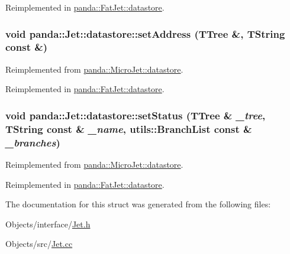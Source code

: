 Reimplemented in \hyperlink{structpanda_1_1FatJet_1_1datastore_ac707315048c1fe184534202259fbdda9}{panda::FatJet::datastore}.\hypertarget{structpanda_1_1Jet_1_1datastore_aba38557e272994b9913ffbe323892d7d}{
\subsubsection[{setAddress}]{\setlength{\rightskip}{0pt plus 5cm}void panda::Jet::datastore::setAddress (TTree \&, \/  TString const \&)}}
\label{structpanda_1_1Jet_1_1datastore_aba38557e272994b9913ffbe323892d7d}


Reimplemented from \hyperlink{structpanda_1_1MicroJet_1_1datastore_a475b19becb4a39eb0248e8b9c785feb3}{panda::MicroJet::datastore}.

Reimplemented in \hyperlink{structpanda_1_1FatJet_1_1datastore_a0064ba6151edcef6eb9d4c5b6a9fdcf7}{panda::FatJet::datastore}.\hypertarget{structpanda_1_1Jet_1_1datastore_ae5a3ebcab7eefec1efc08e4f714ce2ad}{
\subsubsection[{setStatus}]{\setlength{\rightskip}{0pt plus 5cm}void panda::Jet::datastore::setStatus (TTree \& {\em \_\-tree}, \/  TString const \& {\em \_\-name}, \/  {\bf utils::BranchList} const \& {\em \_\-branches})}}
\label{structpanda_1_1Jet_1_1datastore_ae5a3ebcab7eefec1efc08e4f714ce2ad}


Reimplemented from \hyperlink{structpanda_1_1MicroJet_1_1datastore_a5dad86e6e7ed7f7ee5ffb793bb81cbbe}{panda::MicroJet::datastore}.

Reimplemented in \hyperlink{structpanda_1_1FatJet_1_1datastore_a7c0b79a4a6e7875278841d4bc8a7deba}{panda::FatJet::datastore}.

The documentation for this struct was generated from the following files:\begin{DoxyCompactItemize}
\item 
Objects/interface/\hyperlink{Jet_8h}{Jet.h}\item 
Objects/src/\hyperlink{Jet_8cc}{Jet.cc}\end{DoxyCompactItemize}
